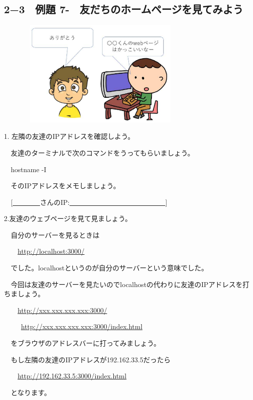 \documentclass[a4paper,12pt,dvipdfmx]{jarticle}
\newcounter{Exercise}
\renewcommand\theExercise{例題 7-\arabic{Exercise}}
\begin{document}
\bigskip


\bigskip


\bigskip

\clearpage\subsection*{2−3　\theExercise　友だちのホームページを見てみよう}


\centering
\includegraphics[width=10.423cm,height=5.279cm]{ome7-img042}
\flushleft


\bigskip



1.
左隣の友達のIPアドレスを確認しよう。

\ \ 友達のターミナルで次のコマンドをうってもらいましょう。

\ \ hostname -I

\ \ そのIPアドレスをメモしましょう。

\ \ [\underline{　　　　}さんのIP:\underline{　　　　　　　　　　　　　　}]


\bigskip

2.友達のウェブページを見て見ましょう。

\ \ 自分のサーバーを見るときは

\ \ 　\url{http://localhost:3000/}

\ \ でした。localhostというのが自分のサーバーという意味でした。

\ \ 今回は友達のサーバーを見たいのでlocalhostの代わりに友達のIPアドレスを打ちましょう。

\ \ 　\url{http://xxx.xxx.xxx.xxx:3000/}

\ \ \ 　\url{http://xxx.xxx.xxx.xxx:3000/index.html}

\ \ をブラウザのアドレスバーに打ってみましょう。

\ \ もし左隣の友達のIPアドレスが192.162.33.5だったら

\ \ 　\url{http://192.162.33.5:3000/index.html}

\ \ となります。
\end{document}
